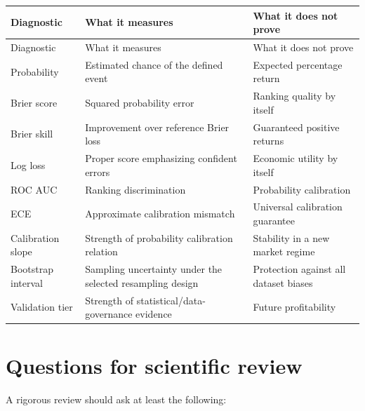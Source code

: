 \documentclass[11pt]{article}
\begin{document}
\begin{longtable}{@{}p{}p{}p{}@{}}
\toprule
Diagnostic & What it measures & What it does not prove \\
\midrule
\endfirsthead
\toprule
Diagnostic & What it measures & What it does not prove \\
\midrule
\endhead
Probability & Estimated chance of the defined event & Expected percentage return \\
Brier score & Squared probability error & Ranking quality by itself \\
Brier skill & Improvement over reference Brier loss & Guaranteed positive returns \\
Log loss & Proper score emphasizing confident errors & Economic utility by itself \\
ROC AUC & Ranking discrimination & Probability calibration \\
ECE & Approximate calibration mismatch & Universal calibration guarantee \\
Calibration slope & Strength of probability calibration relation & Stability in a new market regime \\
Bootstrap interval & Sampling uncertainty under the selected resampling design & Protection against all dataset biases \\
Validation tier & Strength of statistical/data-governance evidence & Future profitability \\
\bottomrule
\end{longtable}

\section{Questions for scientific review}

A rigorous review should ask at least the following:
\end{document}
